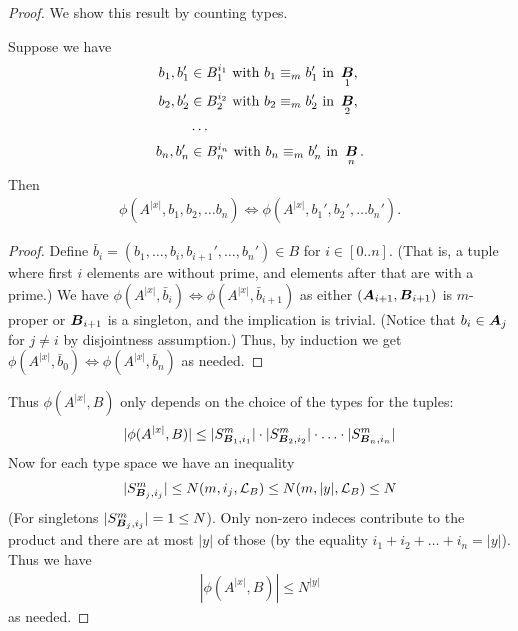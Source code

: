 \documentclass{amsart}
\DeclareMathOperator{\A}{\boldface A}
\DeclareMathOperator{\B}{\boldface B}
\renewcommand{\LL}{\mathcal L}
\begin{document}
\begin{proof}
  We show this result by counting types.
  \begin{Claim}
    Suppose we have
    \begin{align*}
      b_1, b_1' &\in B_1^{i_1} \text{ with } b_1 \equiv_m b_1' \text { in } \B_1, \\
      b_2, b_2' &\in B_2^{i_2} \text{ with } b_2 \equiv_m b_2' \text { in } \B_2, \\
                &\cdots \\
      b_n, b_n' &\in B_n^{i_n} \text{ with } b_n \equiv_m b_n' \text { in } \B_n.
    \end{align*}
    Then
    \begin{align*}
      \phi(A^{|x|}, b_1, b_2, \ldots b_n) \iff \phi(A^{|x|}, b_1', b_2', \ldots b_n').
    \end{align*}
  \end{Claim}
  \begin{proof}
    Define $\bar b_i = (b_1, \ldots, b_i, b_{i+1}', \ldots, b_n') \in B$ for $i \in [0..n]$.
    (That is, a tuple where first $i$ elements are without prime, and elements after that are with a prime.)
    We have $\phi(A^{|x|}, \bar b_i) \iff \phi(A^{|x|}, \bar b_{i+1})$ as either $(\A_{i+1}, \B_{i+1})$ is $m$-proper
    or $\B_{i+1}$ is a singleton, and the implication is trivial.
    (Notice that $b_i \in \A_j$ for $j \neq i$ by disjointness assumption.)
    Thus, by induction we get $\phi(A^{|x|}, \bar b_0) \iff \phi(A^{|x|}, \bar b_n)$ as needed.
  \end{proof}
  Thus $\phi(A^{|x|}, B)$ only depends on the choice of the types for the tuples:
  \begin{align*}
    |\phi(A^{|x|}, B)| \leq |S^m_{\B_1, i_1}| \cdot |S^m_{\B_2, i_2}| \cdot \ldots \cdot |S^m_{\B_n, i_n}|
  \end{align*}
  Now for each type space we have an inequality
  \begin{align*}
    |S^m_{\B_j, i_j}| \leq N(m, i_j, \LL_B) \leq N(m, |y|, \LL_B) \leq N
  \end{align*}
  (For singletons $|S^m_{\B_j, i_j}| = 1 \leq N$). Only non-zero indeces contribute to the product and there are at most $|y|$ of those (by the equality $i_1 + i_2 + \ldots + i_n = |y|$). Thus we have
  \begin{align*}
    |\phi(A^{|x|}, B)| \leq N^{|y|}
  \end{align*}
  as needed.
\end{proof}
\end{document}

